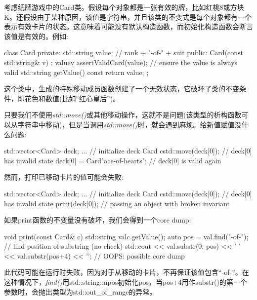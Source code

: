 考虑纸牌游戏中的Card类。假设每个对象都是一张有效的牌，比如红桃8或方块K。还假设由于某种原因，该值是字符串，并且该类的不变式是每个对象都有一个表示有效卡片的状态。这意味着可能没有默认构造函数，而初始化构造函数会断言该值是有效的。例如:\par

\begin{codebox}[cpp]
class Card {
private:
  std::string value; // rank + "-of-" + suit
public:
  Card(const std::string& v)
  : value{v} {
    assertValidCard(value); // ensure the value is always valid
  }
  std::string getValue() const {
    return value;
  }
};
\end{codebox}

这个类中，生成的特殊移动成员函数创建了一个无效状态，它破坏了类的不变条件，即花色和数值(比如“红心皇后”)。\par

只要我们不使用\textit{std::move()}或其他移动操作，这就不是问题(该类型的析构函数可以从字符串中移动)，但是当调用\textit{std::move()}时，就会遇到麻烦。给新值赋值没什么问题:\par

\begin{codebox}[cpp]
std::vector<Card> deck;
... // initialize deck
Card c{std::move(deck[0])}; // deck[0] has invalid state
deck[0] = Card{"ace-of-hearts"}; // deck[0] is valid again
\end{codebox}

然而，打印已移动卡片的值可能会失败:\par

\begin{codebox}[cpp]
std::vector<Card> deck;
... // initialize deck
Card c{std::move(deck[0])}; // deck[0] has invalid state
print(deck[0]); // passing an object with broken invariant
\end{codebox}

如果print函数的不变量没有破坏，我们会得到一个core dump:\par

\begin{codebox}[cpp]
void print(const Card& c) {
  std::string val{c.getValue()};
  auto pos = val.find("-of-"); // find position of substring (no check)
  std::cout << val.substr(0, pos) << ' '
  << val.substr(pos+4) << '\n'; // OOPS: possible core dump
}
\end{codebox}

此代码可能在运行时失败，因为对于从移动的卡片，不再保证该值包含“-of-”。在这种情况下，\textit{find()}用std::string::\allowbreak{}npos初始化pos，当pos+4用作substr()的第一个参数时，会抛出类型为std::out\_of\_range的异常。\par

